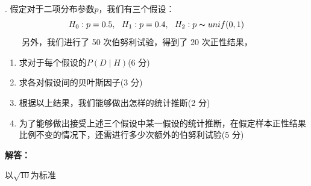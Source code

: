 \documentclass[stu,12pt,floatsintext]{apa7} %
\begin{document}
. {\heiti 假定对于二项分布参数\(p\)，我们有三个假设：
\setlength\abovedisplayskip{0.7em}
\setlength\belowdisplayskip{0.7em}
\[H_0:p = 0.5, \ \ H_1:p=0.4,\ \ H_2:p \thicksim unif(0,1)\]
\ \ \ \  另外，我们进行了 50 次伯努利试验，得到了 20 次正性结果，}

\begin{enumerate}[itemsep=2pt,topsep=0pt,parsep=0pt,label=(\alph*)]
    \item 求对于每个假设的\(P(D \mid H)\)(6 分)
    \item 求各对假设间的贝叶斯因子(3 分)
    \item 根据以上结果，我们能够做出怎样的统计推断(2 分)
    \item 为了能够做出接受上述三个假设中某一假设的统计推断，在假定样本正性结果比例不变的情况下，还需进行多少次额外的伯努利试验(5 分)
\end{enumerate}

\noindent \textbf{解答：}

\hspace{2.2em}以\(\sqrt{10}\)为标准
\end{document}
